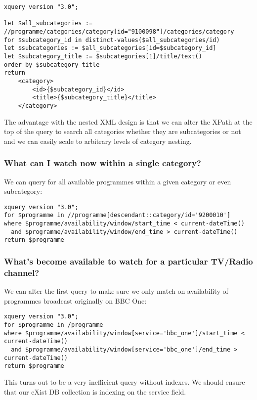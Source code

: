 \documentclass[11pt,a4paper]{article}
\begin{document}
\begin{lstlisting}
xquery version "3.0";

let $all_subcategories := //programme/categories/category[id="9100098"]/categories/category
for $subcategory_id in distinct-values($all_subcategories/id)
let $subcategories := $all_subcategories[id=$subcategory_id]
let $subcategory_title := $subcategories[1]/title/text()
order by $subcategory_title
return 
    <category>
        <id>{$subcategory_id}</id>
        <title>{$subcategory_title}</title>
    </category>
\end{lstlisting}

The advantage with the nested XML design is that we can alter the XPath at
the top of the query to search all categories whether they are subcategories
or not and we can easily scale to arbitrary levels of category nesting.

\subsubsection{What can I watch now within a single category?}

We can query for all available programmes within a given category or even subcategory:

\begin{lstlisting}
xquery version "3.0";
for $programme in //programme[descendant::category/id='9200010']
where $programme/availability/window/start_time < current-dateTime()
  and $programme/availability/window/end_time > current-dateTime()
return $programme
\end{lstlisting}

\subsubsection{What's become available to watch for a particular TV/Radio channel?}

We can alter the first query to make sure we only match on availability of
programmes broadcast originally on BBC One:

\begin{lstlisting}
xquery version "3.0";
for $programme in /programme
where $programme/availability/window[service='bbc_one']/start_time < current-dateTime()
  and $programme/availability/window[service='bbc_one']/end_time > current-dateTime()
return $programme
\end{lstlisting}

This turns out to be a very inefficient query without indexes. We should ensure
that our eXist DB collection is indexing on the service field.
\end{document}
